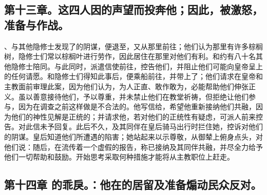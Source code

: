 
\subsection{第十三章。这四人因的声望而投奔他；因此，被激怒，准备与作战。}

、与其他隐修士发现了的阴谋，便退至，又从那里前往；他们认为那里有许多棕榈树，隐修士们常以棕榈叶进行劳作，因此居住在那里对他们有利。和约有八十名其他隐修士陪同。与此同时，派遣信使前往，控告他们，并阻止他们可能向皇帝呈上的任何请愿。和隐修士们得知此事后，便乘船前往，并带上了；他们请求在皇帝和主教面前审理此案，因为他们认为，为人正直、敢作敢为，必能帮助他们伸张正义。虽以善意接待他们，予以尊重，并未禁止他们在教堂祈祷，但拒绝让他们参与，因为在调查之前这样做是不合法的。他写信给，希望他重新接纳他们共融，因为他们的神性见解是正统的；并请求他，若对他们的正统性有疑虑，可派人前来控告。对此信未予回复。此后不久，及其同伴在皇后骑马出行时拦住她，控诉对他们的阴谋。皇后知道他们所遭遇的陷害；她站起来以示尊敬，从御辇上俯身点头，对他们说：随后，在流传着一个虚假的报告，称已接纳及其同伴共融，并尽全力给予他们一切帮助和鼓励。开始思考采取何种措施才能将从主教职位上赶走。\par


\subsection{第十四章 的乖戾。：他在的居留及准备煽动民众反对。}

